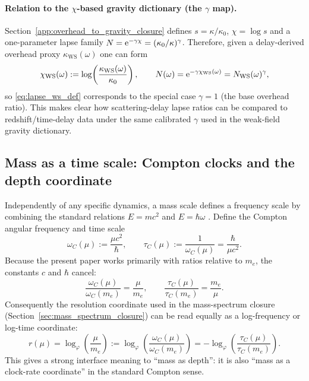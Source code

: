 \paragraph{Relation to the \texorpdfstring{$\chi$}{chi}-based gravity dictionary (the \texorpdfstring{$\gamma$}{gamma} map).}
\InterfaceTag Section~\ref{app:overhead_to_gravity_closure} defines $s=\kappa/\kappa_0$, $\chi=\log s$ and a one-parameter lapse family
$N=\mathrm{e}^{-\gamma\chi}=(\kappa_0/\kappa)^\gamma$.
Therefore, given a delay-derived overhead proxy $\kappa_{\mathrm{WS}}(\omega)$ one can form
\[
\chi_{\mathrm{WS}}(\omega):=\log\!\left(\frac{\kappa_{\mathrm{WS}}(\omega)}{\kappa_0}\right),
\qquad
N(\omega)=\mathrm{e}^{-\gamma\chi_{\mathrm{WS}}(\omega)}=N_{\mathrm{WS}}(\omega)^{\gamma},
\]
so \eqref{eq:lapse_ws_def} corresponds to the special case $\gamma=1$ (the base overhead ratio).
This makes clear how scattering-delay lapse ratios can be compared to redshift/time-delay data under the same calibrated $\gamma$ used in the weak-field gravity dictionary.

\subsection{Mass as a time scale: Compton clocks and the depth coordinate}
\label{app:compton_clock_dictionary}

Independently of any specific dynamics, a mass scale defines a frequency scale by combining the standard relations $E=mc^2$ and $E=\hbar\omega$ \cite{Einstein1905,NielsenChuang2010}.
Define the Compton angular frequency and time scale
\begin{equation}
\label{eq:compton_clock}
\omega_C(\mu):=\frac{\mu c^2}{\hbar},
\qquad
\tau_C(\mu):=\frac{1}{\omega_C(\mu)}=\frac{\hbar}{\mu c^2}.
\end{equation}
Because the present paper works primarily with ratios relative to $m_e$, the constants $c$ and $\hbar$ cancel:
\[
\frac{\omega_C(\mu)}{\omega_C(m_e)}=\frac{\mu}{m_e},
\qquad
\frac{\tau_C(\mu)}{\tau_C(m_e)}=\frac{m_e}{\mu}.
\]
Consequently the resolution coordinate used in the mass-spectrum closure (Section~\ref{sec:mass_spectrum_closure}) can be read equally as a log-frequency or log-time coordinate:
\begin{equation}
\label{eq:r_as_log_compton}
r(\mu)=\log_\varphi\!\left(\frac{\mu}{m_e}\right)
:=\log_\varphi\!\left(\frac{\omega_C(\mu)}{\omega_C(m_e)}\right)
=-\log_\varphi\!\left(\frac{\tau_C(\mu)}{\tau_C(m_e)}\right).
\end{equation}
This gives a strong interface meaning to ``mass as depth'': it is also ``mass as a clock-rate coordinate'' in the standard Compton sense.

